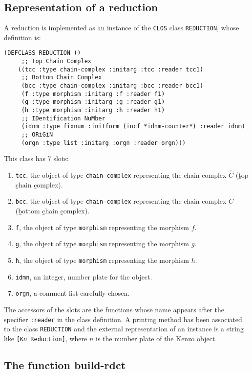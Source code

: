 \subsection {Representation of a reduction}

A reduction is implemented as an instance of
the {\tt CLOS} class {\tt REDUCTION}, whose
definition is:
{\footnotesize\begin{verbatim}
(DEFCLASS REDUCTION ()
     ;; Top Chain Complex
    ((tcc :type chain-complex :initarg :tcc :reader tcc1)
     ;; Bottom Chain Complex
     (bcc :type chain-complex :initarg :bcc :reader bcc1)
     (f :type morphism :initarg :f :reader f1)
     (g :type morphism :initarg :g :reader g1)
     (h :type morphism :initarg :h :reader h1)
     ;; IDentification NuMber
     (idnm :type fixnum :initform (incf *idnm-counter*) :reader idnm)
     ;; ORiGiN
     (orgn :type list :initarg :orgn :reader orgn)))
\end{verbatim}}
This class has $7$  slots:
\begin{enumerate}
\item {\tt tcc}, the object of type {\tt chain-complex} representing the chain complex $\hat C$
(\b top \b chain \b complex).
\item {\tt bcc},  the object of type {\tt chain-complex}  representing the chain complex $C$
(\b bottom \b chain \b complex).
\item {\tt f}, the object of type {\tt morphism}  representing the morphism $f$.
\item {\tt g}, the object of type {\tt morphism}  representing the morphism $g$.
\item {\tt h}, the object of type {\tt morphism}  representing the morphism $h$.
\item {\tt idmn}, an integer, number plate for the object.
\item {\tt orgn}, a comment list carefully chosen.
\end{enumerate}
The accessors of the slots are the functions whose name appears after the specifier {\tt:reader} in
the class definition. A printing method has been associated to the class {\tt REDUCTION}
and the external representation of an instance is a string like {\tt [K{\em n} Reduction]}, where $n$
is the number plate of the Kenzo object.

\subsection {The function build-rdct}

